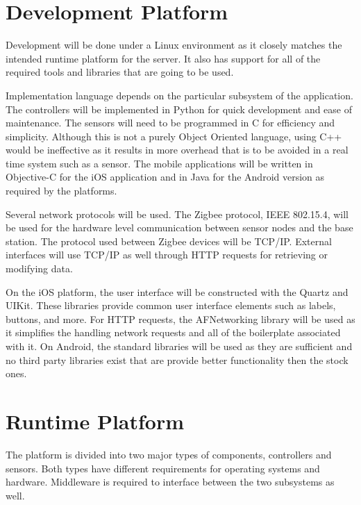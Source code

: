 \documentclass{report}
\begin{document}
\section{Development Platform}


Development will be done under a Linux environment as it closely matches the
intended runtime platform for the server. It also has support for all of the
required tools and libraries that are going to be used. 

Implementation language depends on the particular subsystem of the application.
The controllers will be implemented in Python for quick development and ease of 
maintenance. The sensors will need to be programmed in C for efficiency and
simplicity. Although this is not a purely Object Oriented language, using C++
would be ineffective as it results in more overhead that is to be avoided in a
real time system such as a sensor. The mobile applications will be written in
Objective-C for the iOS application and in Java for the Android version as
required by the platforms.

Several network protocols will be used. The Zigbee protocol, IEEE 802.15.4,
will be used for the hardware level communication between sensor nodes and the
base station. The protocol used between Zigbee devices will be TCP/IP. External
interfaces will use TCP/IP as well through HTTP requests for retrieving or
modifying data. 

On the iOS platform, the user interface will be constructed with the Quartz and
UIKit. These libraries provide common user interface elements such as labels,
buttons, and more. For HTTP requests, the AFNetworking library will be used as
it simplifies the handling network requests and all of the boilerplate
associated with it. On Android, the standard libraries will be used as they are
sufficient and no third party libraries exist that are provide better
functionality then the stock ones.



\section{Runtime Platform}
The platform is divided into two major types of components, controllers and
sensors. Both types have different requirements for operating systems and
hardware. Middleware is required to interface between the two subsystems as well. 
\end{document}
